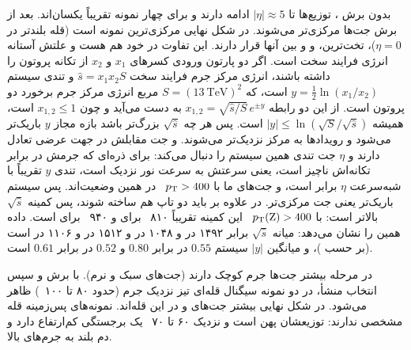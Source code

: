 بدون برش \lr{$\eta$}، توزیع‌ها تا $|\eta|\approx5$ ادامه دارند و برای چهار نمونه تقریباً یکسان‌اند. بعد از برش  جت‌ها مرکزی‌تر می‌شوند. در شکل نهایی \ttZ مرکزی‌ترین نمونه است (قله بلندتر در $\eta=0$)، \Zjet تخت‌ترین، و \bbbb و \ttbb بین آنها قرار دارند. این تفاوت در خود \Zbos{} هم هست و علتش آستانه انرژی فرایند سخت است. اگر دو پارتون ورودی کسرهای $x_1$ و $x_2$ از تکانه پروتون را داشته باشند، انرژی مرکز جرم فرایند سخت $\hat s=x_1x_2S$ و تندی سیستم $y=\frac12\ln(x_1/x_2)$ است، که $S=(13~\mathrm{TeV})^2$ مربع انرژی مرکز جرم برخورد دو پروتون است. از این دو رابطه $x_{1,2}=\sqrt{\hat s/S}\,e^{\pm y}$ به دست می‌آید و چون $x_{1,2}\le1$ است، همیشه $|y|\le\ln(\sqrt{S}/\sqrt{\hat s})$ است. پس هر چه $\sqrt{\hat s}$ بزرگ‌تر باشد بازه مجاز $y$ باریک‌تر می‌شود و رویدادها به مرکز نزدیک‌تر می‌شوند. \Zbos{} و جت مقابلش در جهت عرضی تعادل دارند و $\eta$ جت تندی همین سیستم را دنبال می‌کند: برای ذره‌ای که جرمش در برابر تکانه‌اش ناچیز است، یعنی سرعتش به سرعت نور نزدیک است، تندی $y$ تقریباً با شبه‌سرعت $\eta$ برابر است، و جت‌های ما با $p_\mathrm{T}>400$~ در همین وضعیت‌اند. پس سیستم باریک‌تر یعنی جت مرکزی‌تر. در \ttZ علاوه بر \Zbos{} باید دو تاپ هم ساخته شوند، پس کمینه $\sqrt{\hat s}$ بالاتر است: با $p_\mathrm{T}(\mathrm{Z})>400$~ این کمینه تقریباً ۸۱۰~ برای \Zjet و ۹۴۰~ برای \ttZ است. داده همین را نشان می‌دهد: میانه $\sqrt{\hat s}$ برابر ۱۴۹۲ در \ttZ و ۱۰۴۸ در \Zjet و ۱۵۱۲ در \ttbb و ۱۱۰۶ در \bbbb است (بر حسب )، و میانگین $|y|$ سیستم $0.55$ در برابر $0.80$ و $0.52$ در برابر $0.61$ است.

در مرحله  بیشتر جت‌ها جرم کوچک دارند (جت‌های سبک و نرم). با برش  و سپس انتخاب منشأ، در دو نمونه سیگنال قله‌ای تیز نزدیک جرم \Zbos{} (حدود ۸۰ تا ۱۰۰~) ظاهر می‌شود. در شکل نهایی بیشتر جت‌های \Zjet و \ttZ در این قله‌اند. نمونه‌های پس‌زمینه قله مشخصی ندارند: توزیعشان پهن است و نزدیک ۶۰ تا ۷۰~ یک برجستگی کم‌ارتفاع دارد و دم بلند به جرم‌های بالا.

